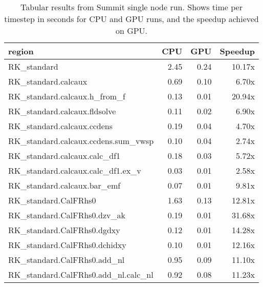 \begin{table*}[htb]
  \centering
  \begin{tabular}{|l|rrr|}
  \hline
  region & CPU & GPU & Speedup \\
  \hline
  RK{\_}standard                                          &   2.45 &  0.24 & 10.17x \\
  RK{\_}standard.calcaux                                  &   0.69 &  0.10 &  6.70x \\
  RK{\_}standard.calcaux.h{\_}from{\_}f                   &   0.13 &  0.01 & 20.94x \\
  RK{\_}standard.calcaux.fldsolve                         &   0.11 &  0.02 &  6.90x \\
  RK{\_}standard.calcaux.ccdens                           &   0.19 &  0.04 &  4.70x \\
  RK{\_}standard.calcaux.ccdens.sum{\_}vwsp               &   0.10 &  0.04 &  2.74x \\
  RK{\_}standard.calcaux.calc{\_}df1                      &   0.18 &  0.03 &  5.72x \\
  RK{\_}standard.calcaux.calc{\_}df1.ex{\_}v              &   0.03 &  0.01 &  2.58x \\
  RK{\_}standard.calcaux.bar{\_}emf                       &   0.07 &  0.01 &  9.81x \\
  RK{\_}standard.CalFRhs0                                 &   1.63 &  0.13 & 12.81x \\
  RK{\_}standard.CalFRhs0.dzv{\_}ak                       &   0.19 &  0.01 & 31.68x \\
  RK{\_}standard.CalFRhs0.dgdxy                           &   0.12 &  0.01 & 14.28x \\
  RK{\_}standard.CalFRhs0.dchidxy                         &   0.10 &  0.01 & 12.16x \\
  RK{\_}standard.CalFRhs0.add{\_}nl                       &   0.95 &  0.09 & 11.10x \\
  RK{\_}standard.CalFRhs0.add{\_}nl.calc{\_}nl            &   0.92 &  0.08 & 11.23x \\
  \hline
  \end{tabular}
  \caption{Tabular results from Summit single node run. Shows time per timestep in seconds for CPU and GPU runs, and the speedup achieved on GPU.}
  \label{tab:single_node}
\end{table*}
